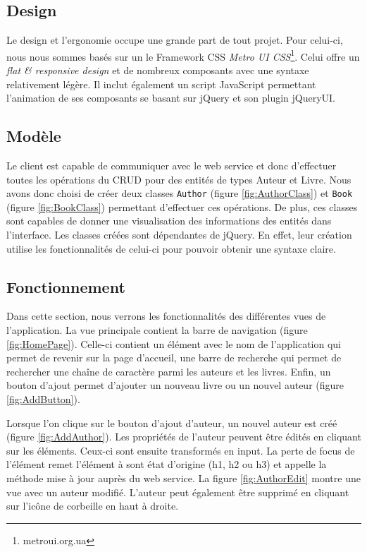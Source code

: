 \subsection{Design}
Le design et l'ergonomie occupe une grande part de tout projet. Pour celui-ci, nous nous sommes basés sur un le Framework CSS \textit{Metro UI CSS}\footnote{metroui.org.ua}. Celui offre un \textit{flat \& responsive design} et de nombreux composants avec une syntaxe relativement légère. Il inclut également un script JavaScript permettant l'animation de ses composants se basant sur jQuery et son plugin jQueryUI.

\subsection{Modèle}
Le client est capable de communiquer avec le web service et donc d'effectuer toutes les opérations du CRUD pour des entités de types Auteur et Livre. Nous avons donc choisi de créer deux classes \texttt{Author} (figure \ref{fig:AuthorClass}) et \texttt{Book} (figure \ref{fig:BookClass}) permettant d'effectuer ces opérations. De plus, ces classes sont capables de donner une visualisation des informations des entités dans l'interface.
Les classes créées sont dépendantes de jQuery. En effet, leur création utilise les fonctionnalités de celui-ci pour pouvoir obtenir une syntaxe claire.

\subsection{Fonctionnement}
Dans cette section, nous verrons les fonctionnalités des différentes vues de l'application.
La vue principale contient la barre de navigation (figure \ref{fig:HomePage}). Celle-ci contient un élément avec le nom de l'application qui permet de revenir sur la page d'accueil, une barre de recherche qui permet de rechercher une chaîne de caractère parmi les auteurs et les livres. Enfin, un bouton d'ajout permet d'ajouter un nouveau livre ou un nouvel auteur (figure \ref{fig:AddButton}).


Lorsque l'on clique sur le bouton d'ajout d'auteur, un nouvel auteur est créé (figure \ref{fig:AddAuthor}). Les propriétés de l'auteur peuvent être édités en cliquant sur les éléments. Ceux-ci sont ensuite transformés en input. La perte de focus de l'élément remet l'élément à sont état d'origine (h1, h2 ou h3) et appelle la méthode mise à jour auprès du web service. La figure \ref{fig:AuthorEdit} montre une vue avec un auteur modifié. L'auteur peut également être supprimé en cliquant sur l'icône de corbeille en haut à droite.

